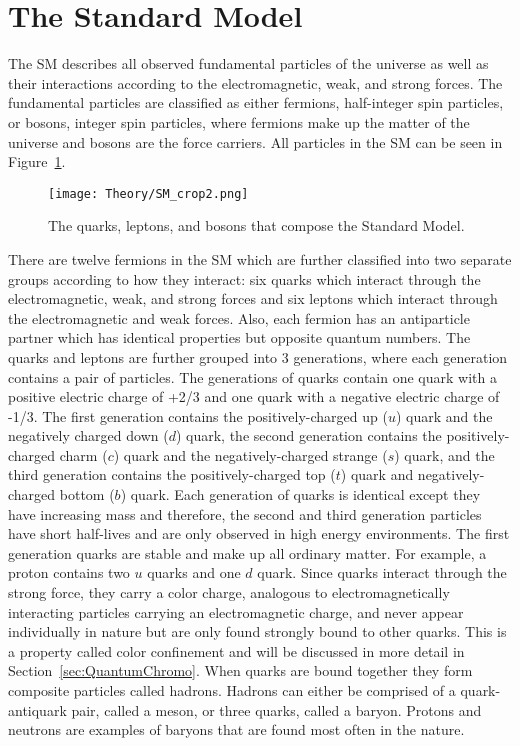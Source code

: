 \section{The Standard Model}

The SM describes all observed fundamental particles of the universe as well as their interactions according to the electromagnetic, weak, and strong forces. The fundamental particles are classified as either fermions, half-integer spin particles, or bosons, integer spin particles, where fermions make up the matter of the universe and bosons are the force carriers. All particles in the SM can be seen in Figure~\ref{fig:StandardModel}\cite{SM}.

\begin{figure}[htbp]
\begin{center}
\texttt{[image: Theory/SM\_crop2.png]}
\end{center}
\caption{The quarks, leptons, and bosons that compose the Standard Model\cite{SM}.}
\label{fig:StandardModel}
\end{figure}

There are twelve fermions in the SM which are further classified into two separate groups according to how they interact: six quarks which interact through the electromagnetic, weak, and strong forces and six leptons which interact through the electromagnetic and weak forces. Also, each fermion has an antiparticle partner which has identical properties but opposite quantum numbers. The quarks and leptons are further grouped into 3 generations, where each generation contains a pair of particles. The generations of quarks contain one quark with a positive electric charge of +2/3 and one quark with a negative electric charge of -1/3. The first generation contains the positively-charged up ($u$) quark and the negatively charged down ($d$) quark, the second generation contains the positively-charged charm ($c$) quark and the negatively-charged strange ($s$) quark, and the third generation contains the positively-charged top ($t$) quark and negatively-charged bottom ($b$) quark. Each generation of quarks is identical except they have increasing mass and therefore, the second and third generation particles have short half-lives and are only observed in high energy environments. The first generation quarks are stable and make up all ordinary matter. For example, a proton contains two $u$ quarks and one $d$ quark. Since quarks interact through the strong force, they carry a color charge, analogous to electromagnetically interacting particles carrying an electromagnetic charge, and never appear individually in nature but are only found strongly bound to other quarks. This is a property called color confinement and will be discussed in more detail in Section~\ref{sec:QuantumChromo}. When quarks are bound together they form composite particles called hadrons. Hadrons can either be comprised of a quark-antiquark pair, called a meson, or three quarks, called a baryon. Protons and neutrons are examples of baryons that are found most often in the nature. 

